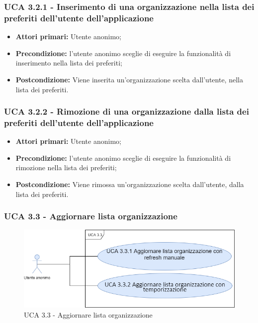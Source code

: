 \subsubsection{UCA 3.2.1 - Inserimento di una organizzazione nella lista dei preferiti dell'utente dell'applicazione}%
\begin{itemize}
	\item \textbf{Attori primari:} Utente anonimo;
	\item \textbf{Precondizione:} l'utente anonimo sceglie di eseguire la funzionalità di inserimento nella lista dei preferiti; 
	\item \textbf{Postcondizione:} Viene inserita un'organizzazione scelta dall'utente, nella lista dei preferiti.
\end{itemize}

\subsubsection{UCA 3.2.2 - Rimozione di una organizzazione dalla lista dei preferiti dell'utente dell'applicazione}%
\begin{itemize}
	\item \textbf{Attori primari:} Utente anonimo;
	\item \textbf{Precondizione:}  l'utente anonimo sceglie di eseguire la funzionalità di rimozione nella lista dei preferiti;
	\item \textbf{Postcondizione:} Viene rimossa un'organizzazione scelta dall'utente, dalla lista dei preferiti.
\end{itemize}



\subsubsection{UCA 3.3 - Aggiornare lista organizzazione}%

\begin{figure}[h]
	\centering
	\includegraphics[scale=0.5]{sezioni/UseCase/Immagini/UCA3.3.png}
	\caption{UCA 3.3 - Aggiornare lista organizzazione}
\end{figure}

